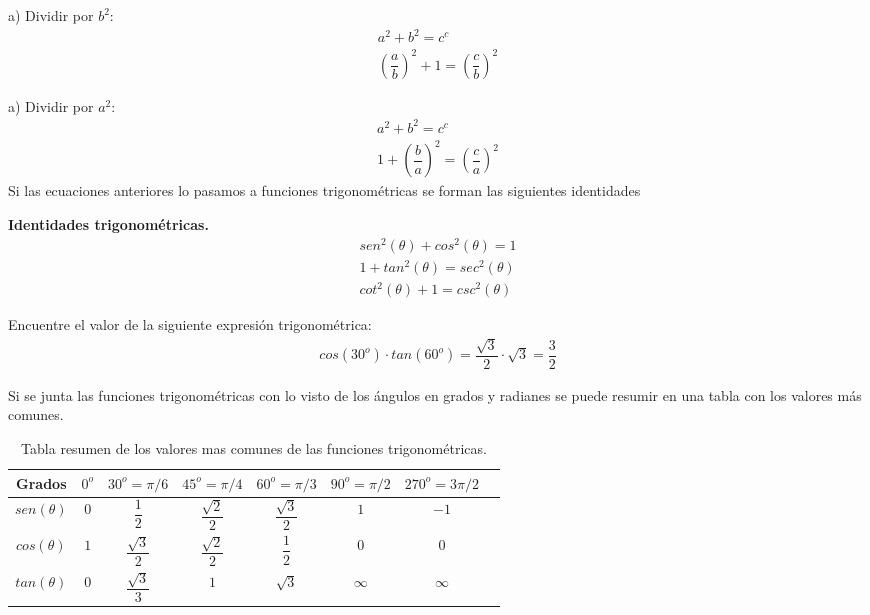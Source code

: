 \noindent a) Dividir por $b^{2}:$
\begin{eqnarray}
a^{2}+b^{2}=c^{c} \\
\left(\dfrac{a}{b}\right)^{2}+1=\left(\dfrac{c}{b}\right)^{2}
\end{eqnarray}

\noindent a) Dividir por $a^{2}:$
\begin{eqnarray}
a^{2}+b^{2}=c^{c} \\
1+\left(\dfrac{b}{a}\right)^{2}=\left(\dfrac{c}{a}\right)^{2}
\end{eqnarray}
Si las ecuaciones anteriores lo pasamos a funciones trigonométricas se forman las siguientes identidades

\begin{mydef}
\textbf{Identidades trigonométricas. }
\begin{eqnarray}
sen^{2}(\theta)+cos^{2}(\theta)=1\\
1+tan^{2}(\theta)=sec^{2}(\theta)\\
cot^{2}(\theta)+1=csc^{2}(\theta)
\end{eqnarray}
\end{mydef}
\begin{myexample}
Encuentre el valor de la siguiente expresión trigonométrica:
\begin{eqnarray*}
cos(30^{o})\cdot tan(60^{o})=\dfrac{\sqrt{3}}{2}\cdot\sqrt{3}=\dfrac{3}{2}
\end{eqnarray*}
\end{myexample}
Si se junta las funciones trigonométricas con lo visto de los ángulos en grados y radianes se puede resumir en una tabla con los valores más comunes.

\begin{table}[h!]
\begin{center}
 \begin{tabular}{|c|c|c|c|c|c|c|c|}
 \hline
Grados &$0^{o}$&$30^{o}=\pi/6$&$45^{o}=\pi/4$&$60^{o}=\pi/3$&$90^{o}=\pi/2$&$270^{o}=3\pi/2$ \\
 \hline
 $sen(\theta)$&$0$&$\dfrac{1}{2}$&$\dfrac{\sqrt{2}}{2}$&$\dfrac{\sqrt{3}}{2}$&$1$&$-1$ \\
 \hline
 $cos(\theta)$&$1$&$\dfrac{\sqrt{3}}{2}$&$\dfrac{\sqrt{2}}{2}$&$\dfrac{1}{2}$&$0$&$0$ \\
 \hline
 $tan(\theta)$&$0$&$\dfrac{\sqrt{3}}{3}$&$1$&$\sqrt{3}$&$\infty$&$\infty$ \\
 \hline
 \end{tabular}
 \caption{Tabla resumen de los valores mas comunes de las funciones trigonométricas.}
 \end{center}
\end{table}

